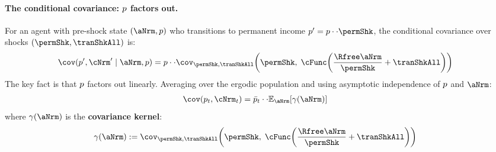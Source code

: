 \documentclass[\econtexRoot/BufferStockTheory]{subfiles}
\begin{document}
\paragraph{The conditional covariance: $p$ factors out.}
For an agent with pre-shock state $(\aNrm, \permLvlPrb)$ who transitions to permanent income $\permLvlPrb' = \permLvlPrb \cdot \PermGroFac \cdot \permShk$, the conditional covariance over shocks $(\permShk, \tranShkAll)$ is:
\begin{equation}\begin{gathered}\begin{aligned} \label{eq:CondCov}
\cov(\permLvlPrb', \cNrm' \mid \aNrm, \permLvlPrb) & = \permLvlPrb \cdot \PermGroFac \cdot \cov_{\permShk,\tranShkAll}\!\left(\permShk, \; \cFunc\!\left(\frac{\Rfree\aNrm}{\PermGroFac\permShk} + \tranShkAll\right)\right)
\end{aligned}\end{gathered}\end{equation}
The key fact is that $p$ factors out linearly. Averaging over the ergodic population and using asymptotic independence of $p$ and $\aNrm$:
\begin{equation}\begin{gathered}\begin{aligned} \label{eq:CovFrom1D}
\cov(\permLvlPrb_{t}, \cNrm_{t}) & = \bar{\permLvlPrb}_{t} \cdot \PermGroFac \cdot \mathbb{E}_{\aNrm}\!\left[\gamma(\aNrm)\right]
\end{aligned}\end{gathered}\end{equation}
where $\gamma(\aNrm)$ is the \textbf{covariance kernel}:
\begin{equation}\begin{gathered}\begin{aligned} \label{eq:CovKernel}
\gamma(\aNrm) & := \cov_{\permShk,\tranShkAll}\!\left(\permShk, \; \cFunc\!\left(\frac{\Rfree\aNrm}{\PermGroFac\permShk} + \tranShkAll\right)\right)
\end{aligned}\end{gathered}\end{equation}
\end{document}
